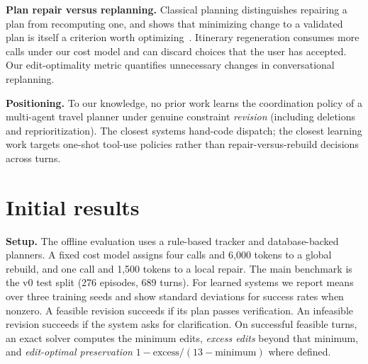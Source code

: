 \documentclass{article}
\begin{document}
\textbf{Plan repair versus replanning.} Classical planning distinguishes
repairing a plan from recomputing one, and shows that minimizing change to a
validated plan is itself a criterion worth
optimizing~\citep{fox2006planstability}. Itinerary regeneration consumes
more calls under our cost model and can discard choices that the user
has accepted. Our edit-optimality metric quantifies unnecessary changes
in conversational replanning.

\textbf{Positioning.} To our knowledge, no prior work learns the
coordination policy of a multi-agent travel planner under genuine constraint
\emph{revision} (including deletions and reprioritization). The closest
systems hand-code dispatch; the closest learning work targets one-shot
tool-use policies rather than repair-versus-rebuild decisions across turns.

\section{Initial results}
\label{sec:results}

\textbf{Setup.} The offline evaluation uses a rule-based tracker and
database-backed planners. A fixed cost model assigns four calls and
6{,}000 tokens to a global rebuild, and one call and 1{,}500 tokens to a
local repair. The main benchmark is the v0 test split (276 episodes,
689 turns). For learned systems we report means over three training seeds
and show standard deviations for success rates when nonzero. A feasible
revision succeeds if its plan passes verification. An infeasible revision
succeeds if the system asks for clarification. On successful feasible
turns, an exact solver computes the minimum edits, \emph{excess edits}
beyond that minimum, and \emph{edit-optimal preservation}
$1-\text{excess}/(13-\text{minimum})$ where defined.
\end{document}
